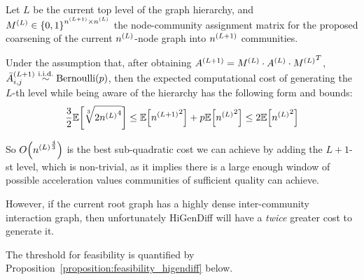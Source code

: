\begin{proposition}
    \label{proposition:complexity_higendiff}
    Let $L$ be the current top level of the graph hierarchy, and $M^{\mathopen{}\left(L\right)} \in \mathopen{}\left\{0,1\right\}^{n^{\mathopen{}\left(L+1\right)}\times n^{\mathopen{}\left(L\right)}}$ the node-community assignment matrix for the proposed coarsening of the current $n^{\mathopen{}\left(L\right)}$-node graph into $n^{\mathopen{}\left(L+1\right)}$ communities. 
    
    Under the assumption that, after obtaining $A^{\mathopen{}\left(L+1\right)}=M^{\mathopen{}\left(L\right)} \cdot A^{\mathopen{}\left(L\right)} \cdot {M^{\mathopen{}\left(L\right)}}^T$, $\bar{A}_{i,j}^{\mathopen{}\left(L+1\right)} \overset{\text{i.i.d.}}{\sim} \text{Bernoulli}\mathopen{}\left(p\right)$, then the expected computational cost of generating the $L$-th level while being aware of the hierarchy has the following form and bounds:
    \begin{equation}
         \frac{3}{2}\mathbb{E}\mathopen{}\left[\sqrt[3]{2{n^{\mathopen{}\left(L\right)}}^4}\right] \leq \mathbb{E}\mathopen{}\left[{n^{\mathopen{}\left(L+1\right)}}^2\right] + p \mathbb{E}\mathopen{}\left[{n^{\mathopen{}\left(L\right)}}^2\right] \leq 2\mathbb{E}\mathopen{}\left[{n^{\mathopen{}\left(L\right)}}^2\right]
    \end{equation}
\end{proposition}

So $O\mathopen{}\left({n^{\mathopen{}\left(L\right)}}^{\frac{4}{3}}\right)$ is the best sub-quadratic cost we can achieve by adding the $L+1$-st level, which is non-trivial, as it implies there is a large enough window of possible acceleration values communities of sufficient quality can achieve. 

However, if the current root graph has a highly dense inter-community interaction graph, then unfortunately HiGenDiff will have a \emph{twice} greater cost to generate it. 

The threshold for feasibility is quantified by Proposition~\ref{proposition:feasibility_higendiff} below.

